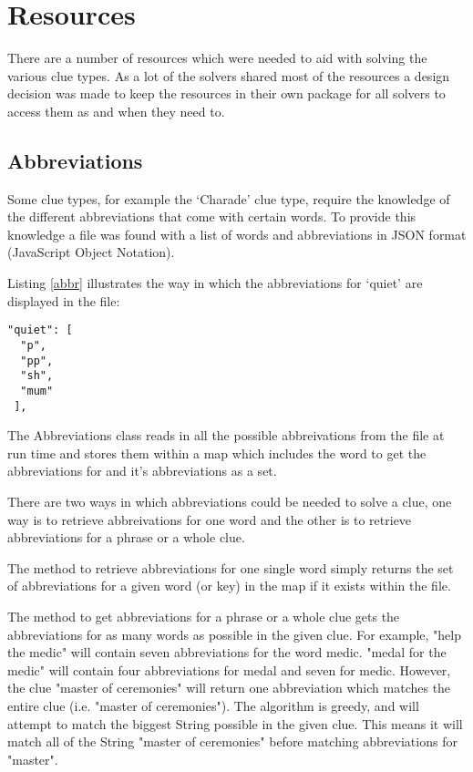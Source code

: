 \section{Resources}
\label{sec:resources}

There are a number of resources which were needed to aid with solving 
the various clue types. As a lot of the solvers shared most of the resources 
a design decision was made to keep the resources in their own package for 
all solvers to access them as and when they need to.

\subsection{Abbreviations}

Some clue types, for example the `Charade' clue type, require the knowledge 
of the different abbreviations that come with certain words. To provide this 
knowledge a file was found with a list of words and abbreviations in JSON 
format (JavaScript Object Notation). 

Listing \ref{abbr} illustrates the way in which the abbreviations for `quiet' 
are displayed in the file:

\begin{lstlisting}[caption={A sample of the abbreviations file},
                   label=abbr]  
 "quiet": [
  "p", 
  "pp", 
  "sh", 
  "mum"
 ], 
\end{lstlisting}

The Abbreviations class reads in all the possible abbreivations from the file 
at run time and stores them within a map which includes the word to get the 
abbreviations for and it's abbreviations as a set. 

There are two ways in which abbreviations could be needed to solve a clue, 
one way is to retrieve abbreivations for one word and the other is to 
retrieve abbreviations for a phrase or a whole clue. 

The method to retrieve abbreviations for one single word simply returns the 
set of abbreviations for a given word (or key) in the map if it exists within the 
file. 

The method to get abbreviations for a phrase or a whole clue gets the 
abbreviations for as many words as possible in the given clue.
For example, "help the medic" will contain seven abbreviations for the word
 medic. "medal for the medic" will contain four abbreviations for medal and seven
 for medic. However, the clue "master of ceremonies" will return one
 abbreviation which matches the entire clue (i.e. "master of ceremonies").
 The algorithm is greedy, and will attempt to match the biggest String
possible in the given clue. This means it will match all of the String
 "master of ceremonies" before matching abbreviations for "master".

